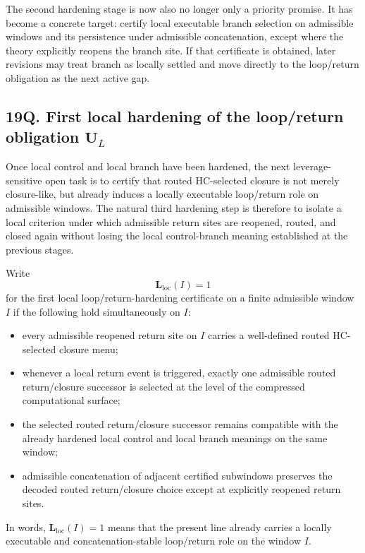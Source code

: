 \begin{corollary}
The second hardening stage is now also no longer only a priority promise. It has become a concrete target: certify local executable branch selection on admissible windows and its persistence under admissible concatenation, except where the theory explicitly reopens the branch site. If that certificate is obtained, later revisions may treat branch as locally settled and move directly to the loop/return obligation as the next active gap.
\end{corollary}


\subsection*{19Q. First local hardening of the loop/return obligation $\mathbf U_L$}
Once local control and local branch have been hardened, the next leverage-sensitive open task is to certify that routed HC-selected closure is not merely closure-like, but already induces a locally executable loop/return role on admissible windows. The natural third hardening step is therefore to isolate a local criterion under which admissible return sites are reopened, routed, and closed again without losing the local control-branch meaning established at the previous stages.

\begin{definition}
Write
\[
\mathbf L_{\mathrm{loc}}(I)=1
\]
for the first local loop/return-hardening certificate on a finite admissible window $I$ if the following hold simultaneously on $I$:
\begin{itemize}[leftmargin=2em]
 \item every admissible reopened return site on $I$ carries a well-defined routed HC-selected closure menu;
 \item whenever a local return event is triggered, exactly one admissible routed return/closure successor is selected at the level of the compressed computational surface;
 \item the selected routed return/closure successor remains compatible with the already hardened local control and local branch meanings on the same window;
 \item admissible concatenation of adjacent certified subwindows preserves the decoded routed return/closure choice except at explicitly reopened return sites.
\end{itemize}
In words, $\mathbf L_{\mathrm{loc}}(I)=1$ means that the present line already carries a locally executable and concatenation-stable loop/return role on the window $I$.
\end{definition}

